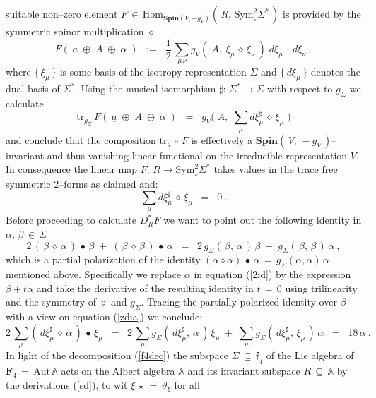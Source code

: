 \documentclass[12pt]{article}
\def\#{\sharp}
\def\A{\mathbb{A}}
\def\Aut{\mathrm{Aut}}
\def\F{\mathbf{F}}
\def\Hom{\mathrm{Hom}}
\def\S{\mathrm{Sym}}
\def\Spin{\mathbf{Spin}}
\def\tr{\mathrm{tr}}
\def\Z{\Sigma}
\begin{document}
 suitable non--zero element $F\,\in\,\Hom_{\Spin(V,-g_V)}(\,R,\,\S^2_\circ
 \Z^*\,)$ is provided by the symmetric spinor multiplication $\diamond$
 $$
  F(\;\underline a\;\oplus\;A\;\oplus\;\alpha\;)
  \;\;:=\;\;
  \frac12\,\sum_{\mu\,\nu}
  g_V(\;A,\;\xi_\mu\,\diamond\,\xi_\nu\;)\;d\xi_\mu\,\cdot\,d\xi_\nu\ ,
 $$
 where $\{\,\xi_\mu\,\}$ is some basis of the isotropy representation $\Z$
 and $\{\,d\xi_\mu\,\}$ denotes the dual basis of $\Z^*$. Using the musical
 isomorphism $\#:\,\Z^*\longrightarrow\Z$ with respect to $g_\Z$ we calculate
 $$
  \tr_{g_\Z}\,F(\;\underline a\;\oplus\;A\;\oplus\;\alpha\;)
  \;\;=\;\;
  g_V\Big(\;A,\;\sum_\mu d\xi^\#_\mu\,\diamond\,\xi_\mu\;\Big)
 $$
 and conclude that the composition $\tr_g\,\circ\,F$ is effectively a
 $\Spin(\,V,\,-g_V\,)$--invariant and thus vanishing linear functional
 on the irreducible representation $V$. In consequence the linear map
 $F:\,R\longrightarrow\S^2_\circ\Z^*$ takes values in the trace free
 symmetric $2$--forms as claimed and:
 \begin{equation}\label{zdia}
  \sum_\mu d\xi^\#_\mu\,\diamond\,\xi_\mu
  \;\;=\;\;
  0\ .
 \end{equation}
 Before proceeding to calculate $D^*_RF$ we want to point out the following
 identity in $\alpha,\,\beta\,\in\,\Z$
 $$
  2\,(\,\beta\,\diamond\,\alpha\,)\,\bullet\,\beta
  \;+\;(\,\beta\,\diamond\,\beta\,)\,\bullet\,\alpha
  \;\;=\;\;
  2\,g_\Z(\,\beta,\,\alpha\,)\,\beta\;+\;g_\Z(\,\beta,\,\beta\,)\,\alpha\ ,
 $$
 which is a partial polarization of the identity $(\alpha\diamond\alpha)
 \,\bullet\,\alpha\,=\,g_\Z(\alpha,\alpha)\,\alpha$ mentioned above.
 Specifically we replace $\alpha$ in equation (\ref{2id}) by the
 expression $\beta+t\alpha$ and take the derivative of the resulting identity
 in $t\,=\,0$ using trilinearity and the symmetry of $\diamond$ and $g_\Z$.
 Tracing the partially polarized identity over $\beta$ with a view on
 equation (\ref{zdia}) we conclude:
 \begin{equation}\label{combs}
  2\,\sum_\mu(\,d\xi^\#_\mu\,\diamond\,\alpha\,)\,\bullet\,\xi_\mu
  \;\;=\;\;
  2\,\sum_\mu g_\Z(\,d\xi^\#_\mu,\,\alpha\,)\,\xi_\mu
  \;+\;\sum_\mu g_\Z(\,d\xi^\#_\mu,\,\xi_\mu\,)\,\alpha
  \;\;=\;\;
  18\,\alpha\ .
 \end{equation}
 In light of the decomposition (\ref{f4dec}) the subspace $\Z\,\subseteq
 \,\mathfrak{f}_4$ of the Lie algebra of $\F_4\,=\,\Aut\,\A$ acts on the
 Albert algebra $\A$ and its invariant subspace $R\,\subseteq\,\A$ by the
 derivations (\ref{sd}), to wit $\xi\,\star\,=\,\vartheta_\xi$ for all
\end{document}
